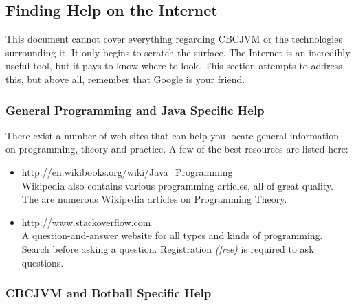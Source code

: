 \documentclass[12pt,letterpaper]{article}
\begin{document}
\subsection{Finding Help on the Internet}

This document cannot cover everything regarding CBCJVM or the technologies surrounding it. It only begins to scratch the surface. The Internet is an incredibly useful tool, but it pays to know where to look. This section attempts to address this, but above all, remember that Google is your friend.



\subsubsection{General Programming and Java Specific Help}

There exist a number of web sites that can help you locate general information on programming, theory and practice. A few of the best resources are listed here:
\begin{itemize}
\item \url{http://en.wikibooks.org/wiki/Java_Programming}\\
      Wikipedia also contains various programming articles, all of great quality. The are numerous Wikipedia articles on Programming Theory.
\item \url{http://www.stackoverflow.com}\\
      A question-and-answer website for all types and kinds of programming. Search before asking a question. Registration \textit{(free)} is required to ask questions.
\end{itemize}



\subsubsection{CBCJVM and Botball Specific Help}
\end{document}
